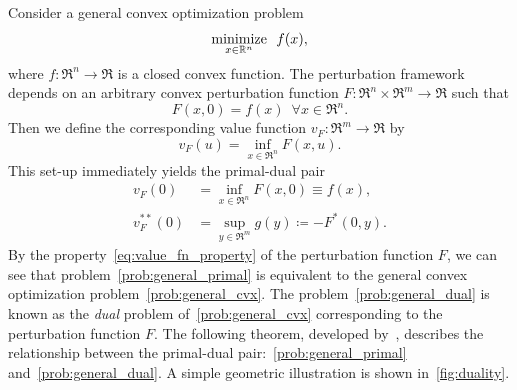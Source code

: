 Consider a general convex optimization problem
\begin{equation} \label{prob:general_cvx}
    \displaystyle\mathop{\hbox{\rm minimize}}_{x \in \mathbb{R}^n}\enspace f(x),
\end{equation}
where $f:\Re^n \to \Re$ is a closed convex function. The perturbation framework depends on an arbitrary convex perturbation function $F: \Re^n \times \Re^m \to \Re$ such that 
\begin{equation} \label{eq:value_fn_property}
    F(x, 0) = f(x) \enspace \forall x \in \Re^n.
\end{equation}
Then we define the corresponding value function $v_F : \Re^m \to \Re$ by
\begin{equation}
    v_F(u) = \inf_{x \in \Re^n} F(x, u).
\end{equation}
This set-up immediately yields the primal-dual pair
\begin{align}
    v_F(0) &= \inf_{x \in \Re^n} F(x, 0) \equiv f(x), \label{prob:general_primal}\\
    v_F^{**}(0) &= \sup_{y \in \Re^m} g(y) \coloneqq -F^*(0, y). \label{prob:general_dual}
\end{align}
By the property~\eqref{eq:value_fn_property} of the perturbation function $F$, we can see that problem~\eqref{prob:general_primal} is equivalent to the general convex optimization problem~\eqref{prob:general_cvx}. The problem~\eqref{prob:general_dual} is known as the \emph{dual} problem of~\eqref{prob:general_cvx} corresponding to the perturbation function $F$. 
The following theorem, developed by~\citet{rockafellar1998variational}, describes the relationship between the primal-dual pair:~\eqref{prob:general_primal} and~\eqref{prob:general_dual}. A simple geometric illustration is shown in~\autoref{fig:duality}.

